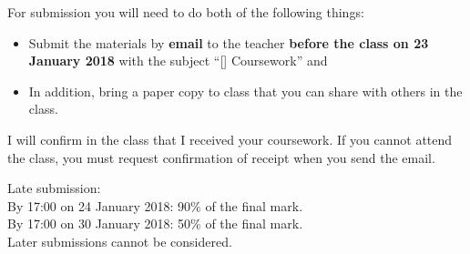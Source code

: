 For submission you will need to do both of the following things:
\begin{itemize}
    \item Submit the materials by \textbf{email} to the teacher \textbf{before the class on 23 January 2018} with the subject ``[\coursenospace] Coursework'' and
    \item In addition, bring a paper copy to class that you can share with others in the class.
\end{itemize}

I will confirm in the class that I received your coursework. If you cannot attend the class, you must request confirmation of receipt when you send the email.

Late submission:\\
By 17:00 on 24 January 2018: 90\% of the final mark.\\
By 17:00 on 30 January 2018: 50\% of the final mark.\\
Later submissions cannot be considered.
